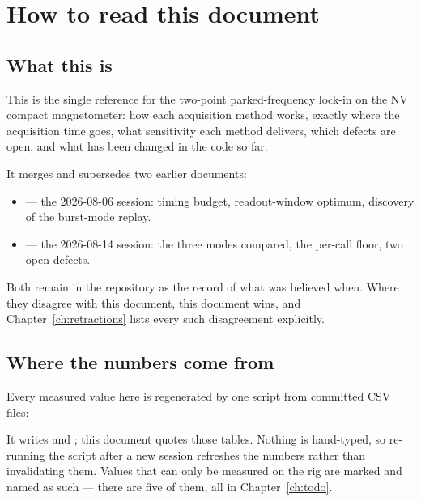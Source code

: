 \chapter{How to read this document}

\section{What this is}

This is the single reference for the two-point parked-frequency lock-in on the
NV compact magnetometer: how each acquisition method works, exactly where the
acquisition time goes, what sensitivity each method delivers, which defects are
open, and what has been changed in the code so far.

It merges and supersedes two earlier documents:

\begin{itemize}
  \item {}
        --- the 2026-08-06 session: timing budget, readout-window optimum,
        discovery of the burst-mode replay.
  \item {}
        --- the 2026-08-14 session: the three modes compared, the per-call floor,
        two open defects.
\end{itemize}

Both remain in the repository as the record of what was believed when. Where they
disagree with this document, this document wins, and
Chapter~\ref{ch:retractions} lists every such disagreement explicitly.

\section{Where the numbers come from}

Every measured value here is regenerated by one script from committed CSV files:

\begin{center}
\end{center}

It writes  and
; this document quotes those tables. Nothing is hand-typed,
so re-running the script after a new session refreshes the numbers rather than
invalidating them. Values that can only be measured on the rig are marked
\Open{} and named as such --- there are five of them, all in
Chapter~\ref{ch:todo}.

